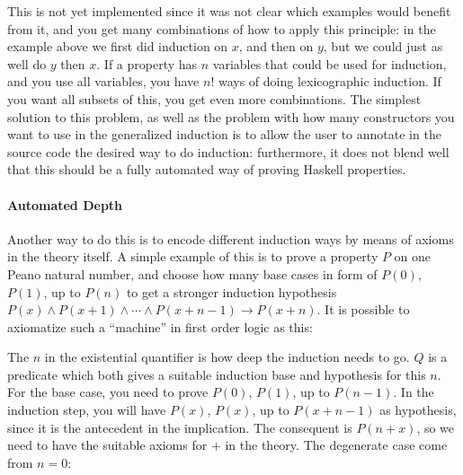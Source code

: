 This is not yet implemented since it was not clear which examples
would benefit from it, and you get many combinations of how to apply
this principle: in the example above we first did induction on $x$,
and then on $y$, but we could just as well do $y$ then $x$. If a
property has $n$ variables that could be used for induction, and you
use all variables, you have $n!$ ways of doing lexicographic
induction. If you want all subsets of this, you get even more
combinations. The simplest solution to this problem, as well as the
problem with how many constructors you want to use in the generalized
induction is to allow the user to annotate in the source code the
desired way to do induction: furthermore, it does not blend well that
this should be a fully automated way of proving Haskell properties.


\paragraph{Automated Depth}
Another way to do this is to encode
different induction ways by means of axioms in the theory itself. A
simple example of this is to prove a property $P$ on one Peano natural
number, and choose how many base cases in form of $P(0)$, $P(1)$, up
to $P(n)$ to get a stronger induction hypothesis $P(x)\wedge
P(x+1)\wedge \cdots\wedge P(x+n-1)\rightarrow P(x+n)$. It is possible
to axiomatize such a ``machine'' in first order logic as this:

\newcommand{\QZ}[2]{\inferrule* [left=q-0]{ }{Q(#1,#2)}}
\newcommand{\QS}[3]{\inferrule* [left=q-s]{P(#2) \and #3}{Q(#1,#2)}}
\newcommand{\IPZ}[2]{\inferrule* [left=+-0]{#1}{#2}}
\newcommand{\IPS}[2]{\inferrule* [left=+-s]{#1}{#2}}


The $n$ in the existential quantifier is how deep the induction needs
to go. $Q$ is a predicate which both gives a suitable induction base
and hypothesis for this $n$. For the base case, you need to prove
$P(0)$, $P(1)$, up to $P(n-1)$. In the induction step, you will have
$P(x)$, $P(x)$, up to $P(x+n-1)$ as hypothesis, since it is the
antecedent in the implication. The consequent is $P(n+x)$, so we need
to have the suitable axioms for $+$ in the theory. The degenerate case
come from $n=0$:

